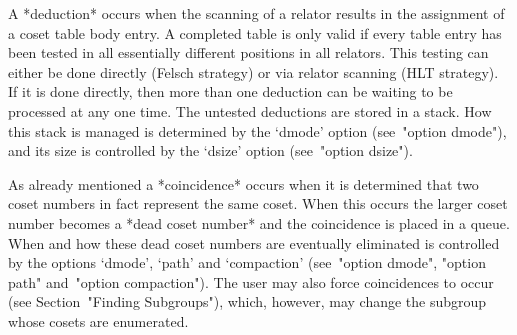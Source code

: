 A *deduction* occurs when the scanning of a  relator  results  in  the
assignment of a coset table body entry.  A  completed  table  is  only
valid if  every  table  entry  has  been  tested  in  all  essentially
different positions in all relators. This testing can either  be  done
directly (Felsch strategy) or via relator scanning (HLT strategy).  If
it is done directly, then more than one deduction can be waiting to be
processed at any one time. The untested deductions  are  stored  in  a
stack. How this stack is managed is determined by the  `dmode'  option
(see~"option dmode"), and its size is controlled by the `dsize' option
(see~"option dsize").

As already mentioned a *coincidence* occurs when it is determined that
two coset numbers in fact represent the same coset. When  this  occurs
the larger  coset  number  becomes  a  *dead  coset  number*  and  the
coincidence is placed in a  queue.  When  and  how  these  dead  coset
numbers  are  eventually  eliminated  is  controlled  by  the  options
`dmode', `path' and `compaction' (see~"option  dmode",  "option  path"
and~"option compaction"). The user  may  also  force  coincidences  to
occur (see Section~"Finding Subgroups"), which,  however,  may  change
the subgroup whose cosets are enumerated.

